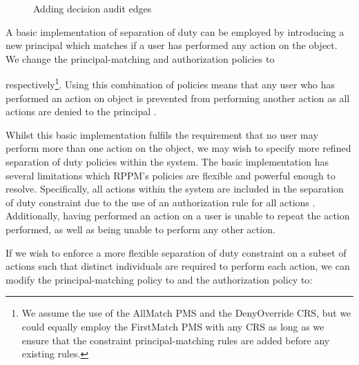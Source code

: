 \documentclass{article}
\newcommand{\audita}[1]{\ensuremath{#1^\oplus}}
\newcommand{\auditd}[1]{\ensuremath{#1^\ominus}}
\begin{document}
\begin{figure}[!ht]
{
        \label{img:system-graph-fragment2:d}
    }
    \caption{Adding decision audit edges}\label{img:system-graph-fragment2}
\end{figure}

A basic implementation of separation of duty can be employed by introducing a new principal  which matches if a user has performed any action on the object.
We change the principal-matching and authorization policies to

respectively\footnote{We assume the use of the \textsf{AllMatch} PMS and the \textsf{DenyOverride} CRS, but we could equally employ the \textsf{FirstMatch} PMS with any CRS as long as we ensure that the constraint principal-matching rules are added before any existing rules.}.
Using this combination of policies means that any user who has performed an action on object  is prevented from performing another action as all actions are denied to the principal .

Whilst this basic implementation fulfils the requirement that no user may perform more than one action on the object, we may wish to specify more refined separation of duty policies within the system.
The basic implementation has several limitations which RPPM's policies are flexible and powerful enough to resolve.
Specifically, all actions within the system are included in the separation of duty constraint due to the use of an authorization rule for all actions .
Additionally, having performed an action on  a user is unable to repeat the action performed, as well as being unable to perform any other action.

If we wish to enforce a more flexible separation of duty constraint on a subset of actions  such that distinct individuals are required to perform each action, we can modify the principal-matching policy to  and the authorization policy to:
\end{document}
